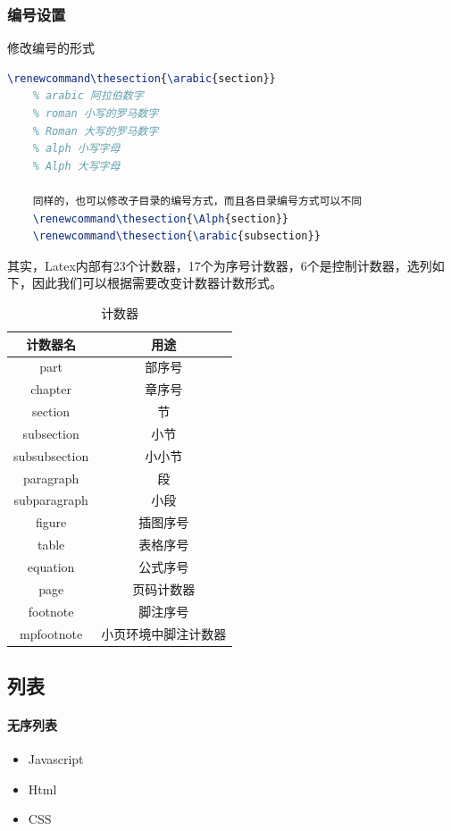 \subsubsection{编号设置}
修改编号的形式
\begin{lstlisting}[language={TeX}]
    \renewcommand\thesection{\arabic{section}} 
    % arabic 阿拉伯数字 
    % roman 小写的罗马数字 
    % Roman 大写的罗马数字 
    % alph 小写字母 
    % Alph 大写字母
    
    同样的，也可以修改子目录的编号方式，而且各目录编号方式可以不同
    \renewcommand\thesection{\Alph{section}} 
    \renewcommand\thesection{\arabic{subsection}}
\end{lstlisting}
其实，Latex内部有23个计数器，17个为序号计数器，6个是控制计数器，选列如下，因此我们可以根据需要改变计数器计数形式。
\begin{table}[h]
    \centering
    \begin{tabular}{|c|c|}
    \hline
    计数器名          & 用途         \\ \hline
    part          & 部序号        \\ \hline
    chapter       & 章序号        \\ \hline
    section       & 节          \\ \hline
    subsection    & 小节         \\ \hline
    subsubsection & 小小节        \\ \hline
    paragraph     & 段          \\ \hline
    subparagraph  & 小段         \\ \hline
    figure        & 插图序号       \\ \hline
    table         & 表格序号       \\ \hline
    equation      & 公式序号       \\ \hline
    page          & 页码计数器      \\ \hline
    footnote      & 脚注序号       \\ \hline
    mpfootnote    & 小页环境中脚注计数器 \\ \hline
    \end{tabular}
    \caption{计数器}
    \label{tab:mytab0}
\end{table}

\subsection{列表}

\paragraph{无序列表}
\begin{itemize}
  \item Javascript
  \item Html
  \item CSS
\end{itemize}

